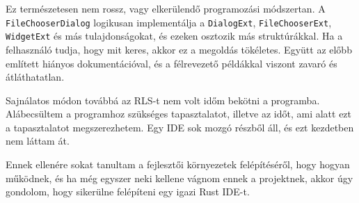 Ez természetesen nem rossz, vagy elkerülendő programozási módszertan.
A \texttt{File\-ChooserDialog} logikusan implementálja a \texttt{DialogExt}, \texttt{FileChooserExt},
\texttt{WidgetExt} és más tulajdonságokat, és ezeken osztozik más struktúrákkal.
Ha a felhasználó tudja, hogy mit keres, akkor ez a megoldás tökéletes.
Együtt az előbb említett hiányos dokumentációval, és a félrevezető példákkal viszont zavaró és átláthatatlan.

Sajnálatos módon továbbá az RLS-t nem volt időm bekötni a programba.
Alábecsültem a programhoz szükséges tapasztalatot, illetve az időt, ami alatt ezt a tapasztalatot megszerezhetem.
Egy IDE sok mozgó részből áll, és ezt kezdetben nem láttam át.

Ennek ellenére sokat tanultam a fejlesztői környezetek felépítéséről, hogy hogyan működnek,
és ha még egyszer neki kellene vágnom ennek a projektnek, akkor úgy gondolom,
hogy sikerülne felépíteni egy igazi Rust IDE-t.
